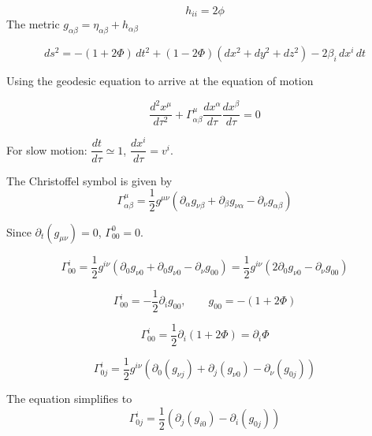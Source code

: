 \documentclass[12pt, a4paper]{article}
\theoremstyle{plain}
\theoremstyle{definition}
\theoremstyle{remark}
\begin{document}
\begin{equation}
    h_{ii}=2\phi
\end{equation}
 The metric  $g_{\alpha \beta}=\eta_{\alpha \beta} + h_{\alpha \beta}$ 

\begin{equation}
    ds^2 = -(1+2\Phi)\,dt^2 + (1-2\Phi)(dx^2+dy^2+dz^2) - 2\beta_i\, dx^i\, dt
    \label{eq:metric}
\end{equation}

Using the geodesic equation to arrive at the equation of motion

\begin{equation}
    \frac{d^2 x^\mu}{d\tau^2} + \Gamma^\mu_{\alpha\beta}\frac{dx^\alpha}{d\tau}\frac{dx^\beta}{d\tau} = 0
    \label{eq:geod}
\end{equation}

For slow motion: $\dfrac{dt}{d\tau} \simeq 1$, $\dfrac{dx^i}{d\tau} = v^i$.

The Christoffel symbol is given by 
\begin{equation}
    \Gamma^\mu_{\alpha\beta} = \frac{1}{2}g^{\mu\nu}\left(\partial_\alpha g_{\nu\beta} + \partial_\beta g_{\nu\alpha} - \partial_\nu g_{\alpha\beta}\right)
\end{equation}

Since $\partial_t(g_{\mu\nu}) = 0$,   $\Gamma^0_{00} = 0$.

\begin{equation}
    \Gamma^i_{00} = \frac{1}{2}g^{i\nu}\left(\partial_0 g_{\nu 0} + \partial_0 g_{\nu 0} - \partial_\nu g_{00}\right) = \frac{1}{2}g^{i\nu}\left(2\partial_0 g_{\nu 0} - \partial_\nu g_{00}\right)
\end{equation}

\begin{equation}
    \Gamma^i_{00} = -\frac{1}{2}\partial_i g_{00}, \qquad g_{00} = -(1+2\Phi)
\end{equation}

\begin{equation}
    \Gamma^i_{00} = \frac{1}{2}\partial_i(1+2\Phi) = \partial_i \Phi
\end{equation}

\begin{equation}
    \Gamma^i_{0j} = \frac{1}{2}g^{i\nu}\left(\partial_0(g_{\nu j}) + \partial_j(g_{\nu 0}) - \partial_\nu(g_{0j})\right)
\end{equation}

The equation simplifies to
\begin{equation}
    \Gamma^i_{0j} = \frac{1}{2}\left(\partial_j(g_{i0}) - \partial_i(g_{0j})\right)
\end{equation}
\end{document}
